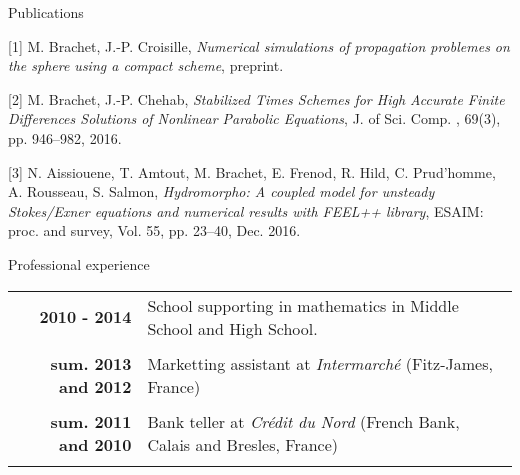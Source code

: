 \documentclass[10pt,a4paper]{report}
\begin{document}
\vspace{.4cm}
\noindent
{\selectfont
\begin{Large}
Publications
\end{Large}
\hrulefill
}
\vspace{0.5cm}

[1] {\sc  M. Brachet, J.-P. Croisille}, {\sl Numerical simulations of propagation problemes on the sphere using a compact scheme}, preprint.

\vspace{0.6cm}

[2] {\sc M. Brachet, J.-P. Chehab}, {\sl Stabilized Times Schemes for High Accurate Finite Differences Solutions of Nonlinear Parabolic Equations}, J. of Sci. Comp. , 69(3), pp. 946--982, 2016.

\vspace{0.6cm}

[3] {\sc  N. Aissiouene, T. Amtout, M. Brachet, E. Frenod, R. Hild, C. Prud'homme, A. Rousseau, S. Salmon}, {\sl  Hydromorpho: A coupled model for unsteady Stokes/Exner equations and numerical results with FEEL++ library}, ESAIM: proc. and survey, Vol. 55, pp. 23--40, Dec. 2016.






\vspace{.5cm}
\noindent
{\selectfont
\begin{Large}
Professional experience
\end{Large}
\hrulefill
}

\noindent
\begin{center}
\begin{tabular}{r l}
\textbf{2010 - 2014} & School supporting in mathematics in Middle School and High School.\\

& \\

\textbf{sum. 2013 and 2012} & Marketting assistant at \textit{Intermarché} (Fitz-James, France) \\

& \\

\textbf{sum. 2011 and 2010} & Bank teller at \textit{Crédit du Nord} (French Bank, Calais and Bresles, France) \\

& \\

\end{tabular}
\end{center}
\end{document}
